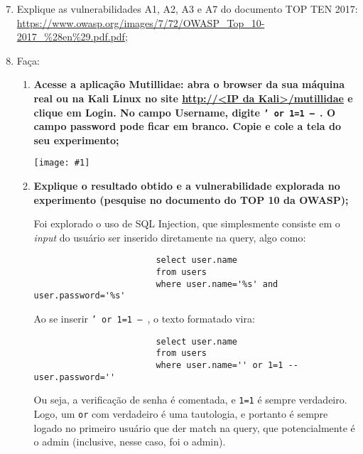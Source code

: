 \documentclass{article}
\newcommand{\code}[1]{\texttt{#1}}
\newcommand{\img}[1]{%
    \texttt{[image: \#1]}
}
\begin{document}
    \begin{enumerate}
        \setcounter{enumi}{6}
        \item Explique as vulnerabilidades A1, A2, A3 e A7 do documento TOP
            TEN 2017:
            \url{https://www.owasp.org/images/7/72/OWASP_Top_10-2017_%28en%29.pdf.pdf};
        \item Faça:
            \begin{enumerate}
                \item \textbf{Acesse a aplicação Mutillidae: abra o browser da
                        sua máquina real ou na Kali Linux no site
                        \url{http://<IP da Kali>/mutillidae} e clique em Login.
                        No campo Username, digite \texttt{' or 1=1 -- }. O
                        campo password pode ficar em branco. Copie e cole a
                    tela do seu experimento;}

                    \img{imgs/q2_2}

                \item \textbf{Explique o resultado obtido e a vulnerabilidade
                    explorada no experimento (pesquise no documento do TOP 10
                da OWASP);}

                    Foi explorado o uso de SQL Injection, que simplesmente
                    consiste em o \textit{input} do usuário ser inserido
                    diretamente na query, algo como:

                    \begin{verbatim}
                        select user.name
                        from users
                        where user.name='%s' and user.password='%s'
                    \end{verbatim}

                    Ao se inserir \code{' or 1=1 -- }, o texto formatado vira:

                    \begin{verbatim}
                        select user.name
                        from users
                        where user.name='' or 1=1 -- user.password=''
                    \end{verbatim}

                    Ou seja, a verificação de senha é comentada, e \code{1=1} é
                    sempre verdadeiro. Logo, um \code{or} com verdadeiro é uma
                    tautologia, e portanto é sempre logado no primeiro usuário
                    que der match na query, que potencialmente é o admin
                    (inclusive, nesse caso, foi o admin).


\end{enumerate}
\end{enumerate}
\end{document}
